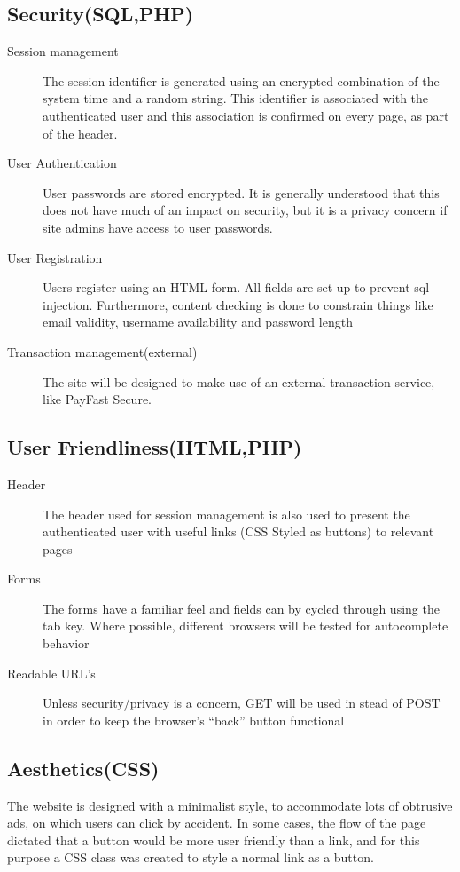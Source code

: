 \documentclass{article}
\begin{document}
\subsection{Security(SQL,PHP)}
\begin{description}
	\item[Session management] The session identifier is generated using an encrypted combination of the system time and a random string. This identifier is associated with the authenticated user and this association is confirmed on every page, as part of the header. 
	\item[User Authentication] User passwords are stored encrypted. It is generally understood that this does not have much of an impact on security, but it is a privacy concern if site admins have access to user passwords.
	\item[User Registration] Users register using an HTML form. All fields are set up to prevent sql injection. Furthermore, content checking is done to constrain things like email validity, username availability and password length
	\item[Transaction management(external)] The site will be designed to make use of an external transaction service, like PayFast Secure.
\end{description}

\subsection{User Friendliness(HTML,PHP)}
\begin{description}
	\item[Header] The header used for session management is also used to present the authenticated user with useful links (CSS Styled as buttons) to relevant pages
	\item[Forms] The forms have a familiar feel and fields can by cycled through using the tab key. Where possible, different browsers will be tested for autocomplete behavior
	\item[Readable URL's] Unless security/privacy is a concern, GET will be used in stead of POST in order to keep the browser's ``back'' button functional
\end{description}

\subsection{Aesthetics(CSS)}
The website is designed with a minimalist style, to accommodate lots of obtrusive ads, on which users can click by accident. In some cases, the flow of the page dictated that a button would be more user friendly than a link, and for this purpose a CSS class was created to style a normal link as a button.
\end{document}
